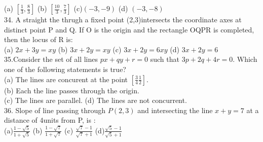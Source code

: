\documentclass[12pt]{article}
\begin{document}
(a) $\left[ \frac{1}{3},\frac{8}{3}\right]$ \hspace{1cm} (b) $\left[ \frac{10}{3},\frac{7}{3}\right]$ \hspace{1cm} (c)$(-3,-9)$ \hspace{1cm} (d) $(-3,-8)$\\
34. A straight the thrugh a fixed point (2,3)intersects the coordinate axes at distinct point P  and Q. If O is the origin and the rectangle OQPR is completed, then the locus of R is:\\
(a) $2x+3y=xy$ \hspace{1cm} (b) $3x+2y=xy$ (c) $3x+2y=6xy$ \hspace{1cm} (d) $3x+2y=6$\\
35.Consider the set of all lines $px+qy+r=0$ such that $3p+2q+4r=0$. Which one of the following statements is true?\\
(a) The lines are concurent at the point $\left[ \frac{3}{4}\frac{1}{2}\right] $.\\
(b) Each the line passes through the origin.\\
(c) The lines are parallel.
(d) The lines are not concurrent.\\
36. Slope of line passing through $P(2,3)$ and intersecting the line $x+y=7$ at a distance of 4units from  P,  is :\\
(a)$\frac{1-\sqrt{5}}{1+\sqrt{5}}$\hspace{1cm} (b) $\frac{1-\sqrt{7}}{1+\sqrt{7}}$\hspace{1cm} (c) $\frac{\sqrt{7}-1}{\sqrt{7}+1}$\hspace{1cm} (d)$\frac{\sqrt{5}-1}{\sqrt{5}+1}$\\
 
\end{document}
